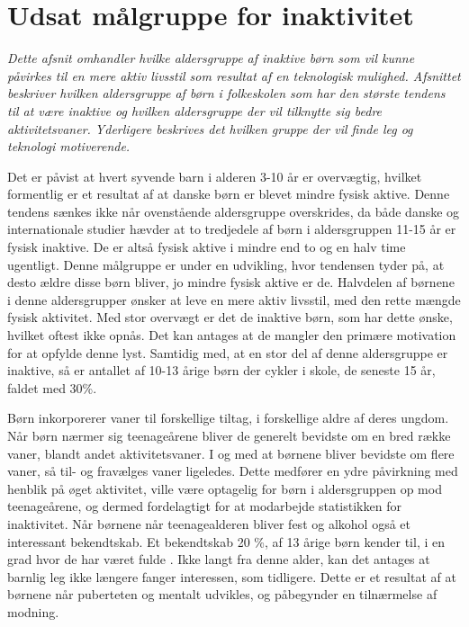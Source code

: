\section {Udsat målgruppe for inaktivitet}
\textit{Dette afsnit omhandler hvilke aldersgruppe af inaktive børn som vil kunne påvirkes til en mere aktiv livsstil som resultat af en teknologisk mulighed. Afsnittet beskriver hvilken aldersgruppe af børn i folkeskolen som har den største tendens til at være inaktive og hvilken aldersgruppe der vil tilknytte sig bedre aktivitetsvaner. Yderligere beskrives det hvilken gruppe der vil finde leg og teknologi motiverende.}
				
Det er påvist at hvert syvende barn i alderen 3-10 år er overvægtig, hvilket formentlig er et resultat af at danske børn er blevet mindre fysisk aktive. Denne tendens sænkes ikke når ovenstående aldersgruppe overskrides, da både danske og internationale studier hævder at to tredjedele af børn i aldersgruppen 11-15 år er fysisk inaktive. De er altså fysisk aktive i mindre end to og en halv time ugentligt. Denne målgruppe er under en udvikling, hvor tendensen tyder på, at desto ældre disse børn bliver, jo mindre fysisk aktive er de. Halvdelen af børnene i denne aldersgrupper ønsker at leve en mere aktiv livsstil, med den rette mængde fysisk aktivitet. Med stor overvægt er det de inaktive børn, som har dette ønske, hvilket oftest ikke opnås. Det kan antages at de mangler den primære motivation for at opfylde denne lyst. Samtidig med, at en stor del af denne aldersgruppe er inaktive, så er antallet af 10-13 årige børn der cykler i skole, de seneste 15 år, faldet med 30\%. \citep{Sundhedsstyrelsen2006}

Børn inkorporerer vaner til forskellige tiltag, i forskellige aldre af deres ungdom. Når børn nærmer sig teenageårene bliver de generelt bevidste om en bred række vaner, blandt andet aktivitetsvaner. I og med at børnene bliver bevidste om flere vaner, så til- og fravælges vaner ligeledes. Dette medfører en ydre påvirkning med henblik på øget aktivitet, ville være optagelig for børn i aldersgruppen op mod teenageårene, og dermed fordelagtigt for at modarbejde statistikken for inaktivitet. \citep{Laub2011} Når børnene når teenagealderen bliver fest og alkohol også et interessant bekendtskab. Et bekendtskab 20 \%, af 13 årige børn kender til, i en grad hvor de har været fulde \citep{Sundhedsstyrelsen2016a}. Ikke langt fra denne alder, kan det antages at barnlig leg ikke længere fanger interessen, som tidligere. Dette er et resultat af at børnene når puberteten og mentalt udvikles, og påbegynder en tilnærmelse af modning. \citep{Skovby2014}

